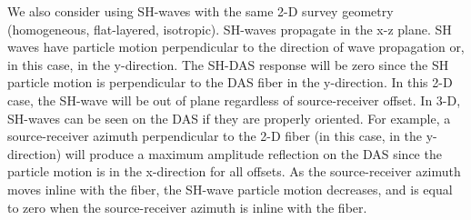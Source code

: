 We also consider using SH-waves with the same 2-D survey geometry (homogeneous, flat-layered, isotropic). SH-waves propagate in the x-z plane. SH waves have particle motion perpendicular to the direction of wave propagation or, in this case, in the y-direction. The SH-DAS response will be zero since the SH particle motion is perpendicular to the DAS fiber in the y-direction. In this 2-D case, the SH-wave will be out of plane regardless of source-receiver offset. In 3-D, SH-waves can be seen on the DAS if they are properly oriented. For example, a source-receiver azimuth perpendicular to the 2-D fiber (in this case, in the y-direction) will produce a maximum amplitude reflection on the DAS since the particle motion is in the x-direction for all offsets. As the source-receiver azimuth moves inline with the fiber, the SH-wave particle motion decreases, and is equal to zero when the source-receiver azimuth is inline with the fiber.

